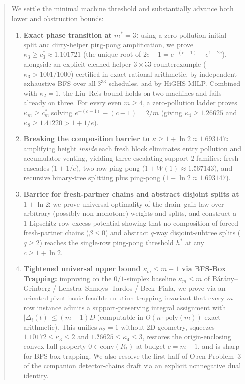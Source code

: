 \documentclass[11pt]{article}
\theoremstyle{definition}
\newcommand{\disc}{\Delta}
\newcommand{\W}{W}
\begin{document}
\begin{abstract}
We settle the minimal machine threshold and substantially advance both lower and obstruction bounds:
\begin{enumerate}
\item \textbf{Exact phase transition at $m^*=3$:} using a zero-pollution initial split and dirty-helper ping-pong amplification, we prove $\kappa_3\ge c_3^*\approx 1.101721$ (the unique root of $2c-1=e^{-(c-1)}+e^{1-2c}$), alongside an explicit cleaned-helper $3\times 33$ counterexample ($\kappa_3>1001/1000$) certified in exact rational arithmetic, by independent exhaustive BFS over all $3^{33}$ schedules, and by HiGHS MILP. Combined with $\kappa_2=1$, the Liu--Reis bound holds on two machines and fails already on three. For every even $m\ge 4$, a zero-pollution ladder proves $\kappa_m\ge c_m^*$ solving $e^{-(c-1)}-(c-1)=2/m$ (giving $\kappa_4\ge 1.26625$ and $\kappa_8\ge 1.41220>1+1/e$).
\item \textbf{Breaking the composition barrier to $\kappa\ge 1+\ln 2\approx 1.693147$:} amplifying height \emph{inside} each fresh block eliminates entry pollution and accumulator venting, yielding three escalating support-2 families: fresh cascades ($1+1/e$), two-row ping-pong ($1+\W(1)\approx 1.567143$), and recursive binary-tree splitting plus ping-pong ($1+\ln 2\approx 1.693147$).
\item \textbf{Barrier for fresh-partner chains and abstract disjoint splits at $1+\ln 2$:} we prove universal optimality of the drain--gain law over arbitrary (possibly non-monotone) weights and splits, and construct a $1$-Lipschitz row-excess potential showing that no composition of forced fresh-partner chains ($\beta\le 0$) and abstract $q$-way disjoint-subtree splits ($q\ge 2$) reaches the single-row ping-pong threshold $h^*$ at any $c\ge 1+\ln 2$.
\item \textbf{Tightened universal upper bound $\kappa_m\le m-1$ via BFS-Box Trapping:} improving on the $0/1$-simplex baseline $\kappa_m\le m$ of B\'ar\'any--Grinberg / Lenstra--Shmoys--Tardos / Beck--Fiala, we prove via an oriented-pivot basic-feasible-solution trapping invariant that every $m$-row instance admits a support-preserving integral assignment with $|\disc_i(t)|\le (m-1)D$ (computable in $O(n\cdot\mathrm{poly}(m))$ exact arithmetic). This unifies $\kappa_2=1$ without 2D geometry, squeezes $1.10172\le \kappa_3\le 2$ and $1.26625\le \kappa_4\le 3$, restores the origin-enclosing convex-hull property $0\in\mathrm{conv}(R_t)$ at budget $c=m-1$, and is sharp for BFS-box trapping. We also resolve the first half of Open Problem~3 of the companion detector-chains draft via an explicit nonnegative dual identity.
\end{enumerate}
\end{abstract}
\end{document}
